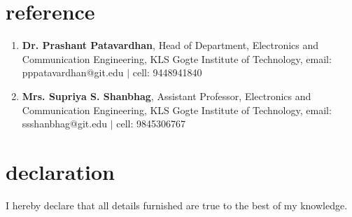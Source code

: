 \documentclass[10pt]{article}
\begin{document}
\section*{reference}
\begin{enumerate}
\item \textbf{Dr. Prashant Patavardhan}, 
Head of Department, Electronics and Communication Engineering, 
KLS Gogte Institute of Technology, 
email: pppatavardhan@git.edu $|$ cell: 9448941840
\item\textbf{Mrs. Supriya S. Shanbhag}, Assistant Professor,  Electronics and Communication Engineering, 
KLS Gogte Institute of Technology, 
email: ssshanbhag@git.edu $|$ cell: 9845306767
\end{enumerate}
\section*{declaration}
I hereby declare that all details furnished are true to the best of my knowledge.
\end{document}
